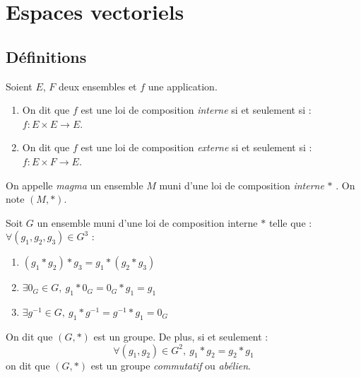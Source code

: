 \chapter{Espaces vectoriels}\label{chap:espaces_vectoriels}

\section{Définitions}
\begin{definition}
	Soient $E$, $F$ deux ensembles et $f$ une application.
	\begin{enumerate}
		\item On dit que $f$ est une loi de composition \emph{interne} si et seulement si : $f : E \times E \to E$.
		\item On dit que $f$ est une loi de composition \emph{externe} si et seulement si : $f : E \times F \to E$.
	\end{enumerate}
\end{definition}

\begin{definition}[Magma]
	On appelle \emph{magma} un ensemble $M$ muni d'une loi de composition \emph{interne} \og $*$ \fg. On note $(M, *)$.
\end{definition}

\begin{definition}[Groupe]
	Soit $G$ un ensemble muni d'une loi de composition interne \og $*$ \fg telle que :
    $\forall (g_1, g_2, g_3) \in G^3$ :
    \begin{multicols}{2}
    	\begin{enumerate}
    		\item $(g_1 * g_2) * g_3 = g_1 * (g_2 * g_3)$
    		\item $\exists 0_G \in G,\ g_1 * 0_G = 0_G * g_1 = g_1$
    		\item $\exists g^{-1} \in G,\ g_1 * g^{-1} = g^{-1} * g_1 = 0_G$
    	\end{enumerate}
    \end{multicols}
    \noindent On dit que $(G, *)$ est un groupe. De plus, si et seulement :
    \[ \forall (g_1, g_2) \in G^2,\ g_1 * g_2 = g_2* g_1 \]
    on dit que $(G, *)$ est un groupe \emph{commutatif} ou \emph{abélien}.
\end{definition}


